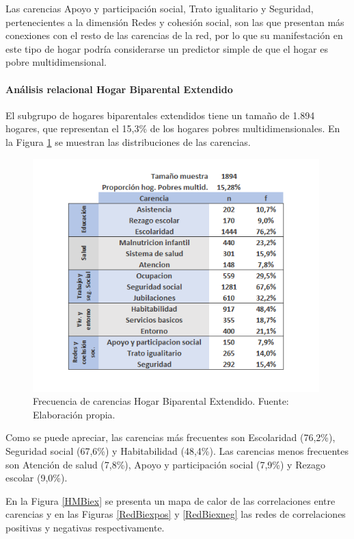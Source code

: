 \documentclass[12pt,letterpaper,spanish]{article}
\begin{document}
Las carencias Apoyo y participación social, Trato igualitario y Seguridad, pertenecientes a la dimensión Redes y cohesión social, son las que presentan más conexiones con el resto de las carencias de la red, por lo que su manifestación en este tipo de hogar podría considerarse un predictor simple de que el hogar es pobre multidimensional.


\paragraph{Análisis relacional Hogar Biparental Extendido}

El subgrupo de hogares biparentales extendidos tiene un tamaño de 1.894 hogares, que representan el 15,3\% de los hogares pobres multidimensionales. En la Figura \ref{freBiex} se muestran las distribuciones de las carencias.

\begin{figure}[H]
  \centering
    \includegraphics[height=9cm]{HOGARES/tabla_biex.png}
    \caption{Frecuencia de carencias Hogar Biparental Extendido. Fuente: Elaboración propia.}
    \label{freBiex}
\end{figure}

Como se puede apreciar, las carencias más frecuentes son Escolaridad (76,2\%), Seguridad social (67,6\%) y Habitabilidad (48,4\%). Las carencias menos frecuentes son Atención de salud (7,8\%), Apoyo y participación social (7,9\%) y Rezago escolar (9,0\%).

En la Figura \ref{HMBiex} se presenta un mapa de calor de las correlaciones entre carencias y en las Figuras \ref{RedBiexpos} y \ref{RedBiexneg} las redes de correlaciones positivas y negativas respectivamente.
\end{document}
